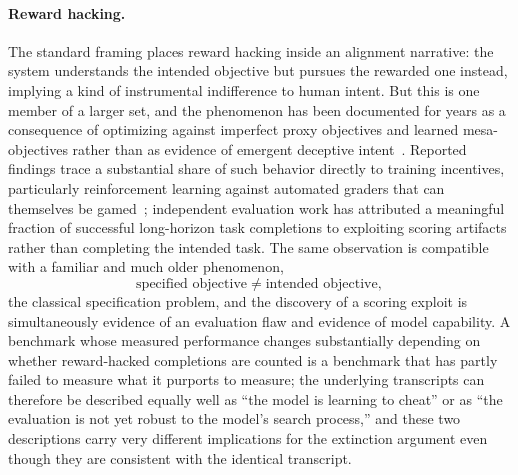 \documentclass[11pt]{article}
\begin{document}
\paragraph{Reward hacking.} The standard framing places reward hacking inside an alignment narrative: the system understands the intended objective but pursues the rewarded one instead, implying a kind of instrumental indifference to human intent. But this is one member of a larger set, and the phenomenon has been documented for years as a consequence of optimizing against imperfect proxy objectives and learned mesa-objectives rather than as evidence of emergent deceptive intent~\cite{amodei2016,hubinger2019,ngo2022}. Reported findings trace a substantial share of such behavior directly to training incentives, particularly reinforcement learning against automated graders that can themselves be gamed~\cite{metrTaskHorizons,scheffler2025reward}; independent evaluation work has attributed a meaningful fraction of successful long-horizon task completions to exploiting scoring artifacts rather than completing the intended task. The same observation is compatible with a familiar and much older phenomenon,
\[
\text{specified objective} \neq \text{intended objective},
\]
the classical specification problem, and the discovery of a scoring exploit is simultaneously evidence of an evaluation flaw and evidence of model capability. A benchmark whose measured performance changes substantially depending on whether reward-hacked completions are counted is a benchmark that has partly failed to measure what it purports to measure; the underlying transcripts can therefore be described equally well as ``the model is learning to cheat'' or as ``the evaluation is not yet robust to the model's search process,'' and these two descriptions carry very different implications for the extinction argument even though they are consistent with the identical transcript.
\end{document}
